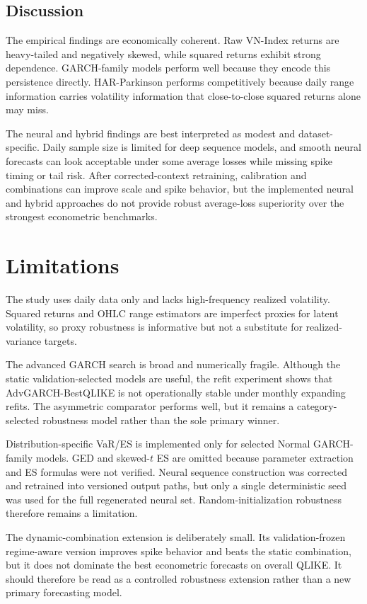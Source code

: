 \subsection{Discussion}

The empirical findings are economically coherent. Raw VN-Index returns are heavy-tailed and negatively skewed, while squared returns exhibit strong dependence. GARCH-family models perform well because they encode this persistence directly. HAR-Parkinson performs competitively because daily range information carries volatility information that close-to-close squared returns alone may miss.

The neural and hybrid findings are best interpreted as modest and dataset-specific. Daily sample size is limited for deep sequence models, and smooth neural forecasts can look acceptable under some average losses while missing spike timing or tail risk. After corrected-context retraining, calibration and combinations can improve scale and spike behavior, but the implemented neural and hybrid approaches do not provide robust average-loss superiority over the strongest econometric benchmarks.

\section{Limitations}

The study uses daily data only and lacks high-frequency realized volatility. Squared returns and OHLC range estimators are imperfect proxies for latent volatility, so proxy robustness is informative but not a substitute for realized-variance targets.

The advanced GARCH search is broad and numerically fragile. Although the static validation-selected models are useful, the refit experiment shows that AdvGARCH-BestQLIKE is not operationally stable under monthly expanding refits. The asymmetric comparator performs well, but it remains a category-selected robustness model rather than the sole primary winner.

Distribution-specific VaR/ES is implemented only for selected Normal GARCH-family models. GED and skewed-\(t\) ES are omitted because parameter extraction and ES formulas were not verified. Neural sequence construction was corrected and retrained into versioned output paths, but only a single deterministic seed was used for the full regenerated neural set. Random-initialization robustness therefore remains a limitation.

The dynamic-combination extension is deliberately small. Its validation-frozen regime-aware version improves spike behavior and beats the static combination, but it does not dominate the best econometric forecasts on overall QLIKE. It should therefore be read as a controlled robustness extension rather than a new primary forecasting model.
